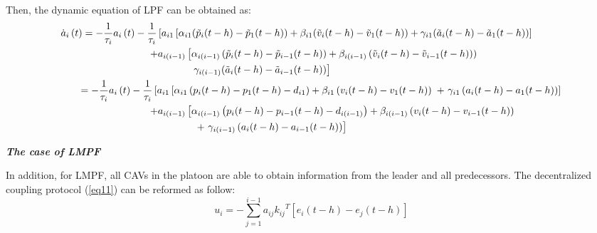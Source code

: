 \documentclass[a4paper]{cas-sc}
\begin{document}
Then, the dynamic equation of LPF can be obtained as:
\begin{equation}
  \begin{gathered}
    {{\dot a}_i}\left( t \right) =  - \frac{1}{{{\tau _i}}}{a_i}\left( t \right) - \frac{1}{{{\tau _i}}}\left[ {{a_{i1}}\left[ {{\alpha _{i1}}({{\tilde p}_i}(t - h) - {{\tilde p}_1}(t - h)) + {\beta _{i1}}({{\tilde v}_i}(t - h) - {{\tilde v}_1}(t - h)) + {\gamma _{i1}}({{\tilde a}_i}(t - h) - {{\tilde a}_1}(t - h))} \right]} \right. \hfill \\
    \quad \quad \quad \quad \quad \quad \quad \quad \quad  + {a_{i(i - 1)}}\left[ {{\alpha _{i(i - 1)}}\left( {{{\tilde p}_i}(t - h) - {{\tilde p}_{i - 1}}(t - h)} \right) + {\beta _{i(i - 1)}}\left( {{{\tilde v}_i}(t - h) - {{\tilde v}_{i - 1}}(t - h))} \right)} \right. \hfill \\
    \quad \quad \quad \quad \quad \quad \quad \quad \quad \quad \quad \quad \quad {\kern 1pt} \left. {{\gamma _{i(i - 1)}}({{\tilde a}_i}(t - h) - {{\tilde a}_{i - 1}}(t - h))} \right] \hfill \\
    \quad \quad  =  - \frac{1}{{{\tau _i}}}{a_i}\left( t \right) - \frac{1}{{{\tau _i}}}\left[ {{a_{i1}}\left[ {{\alpha _{i1}}\left( {{p_i}(t - h) - {p_1}(t - h) - {d_{i1}}} \right) + {\beta _{i1}}\left( {{v_i}(t - h) - {v_1}(t - h)} \right){\text{ + }}{\gamma _{i1}}\left( {{a_i}(t - h) - {a_1}(t - h)} \right)} \right]} \right. \hfill \\
    \quad \quad \quad \quad \quad \quad \quad \quad \quad  + {a_{i(i - 1)}}\left[ {{\alpha _{i(i - 1)}}\left( {{p_i}(t - h) - {p_{i - 1}}(t - h) - {d_{i(i - 1)}}} \right) + {\beta _{i(i - 1)}}\left( {{v_i}(t - h) - {v_{i - 1}}(t - h)} \right)} \right. \hfill \\
    \quad \quad \quad \quad \quad \quad \quad \quad \quad \quad \quad \quad \quad {\kern 1pt} \left. {{\text{ + }}{\gamma _{i(i - 1)}}\left( {{a_i}(t - h) - {a_{i - 1}}(t - h)} \right)} \right] \hfill \\
  \end{gathered}
  \label{eq54}
\end{equation}

\textbf{\emph{The case of LMPF}}

In addition, for LMPF, all CAVs in the platoon are able to obtain information from the leader and all predecessors. The decentralized coupling protocol (\ref{eq11}) can be reformed as follow:
\begin{equation}
  {u_i} =  - \sum\limits_{j = 1}^{i - 1} {{a_{ij}}{k_{ij}}^T\left[ {{e_i}(t - h) - {e_j}(t - h)} \right]}
  \label{eq55}
\end{equation}
\end{document}
